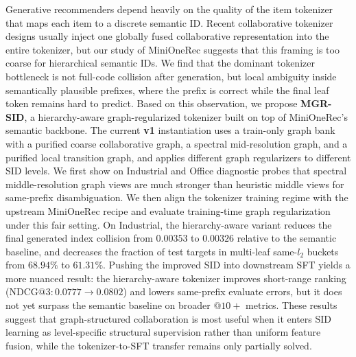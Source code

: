 Generative recommenders depend heavily on the quality of the item tokenizer that maps each item to a discrete semantic ID. Recent collaborative tokenizer designs usually inject one globally fused collaborative representation into the entire tokenizer, but our study of MiniOneRec suggests that this framing is too coarse for hierarchical semantic IDs. We find that the dominant tokenizer bottleneck is not full-code collision after generation, but local ambiguity inside semantically plausible prefixes, where the prefix is correct while the final leaf token remains hard to predict. Based on this observation, we propose \textbf{MGR-SID}, a hierarchy-aware graph-regularized tokenizer built on top of MiniOneRec's semantic \rqvae{} backbone. The current \textbf{v1} instantiation uses a train-only graph bank with a purified coarse collaborative graph, a spectral mid-resolution graph, and a purified local transition graph, and applies different graph regularizers to different SID levels. We first show on Industrial and Office diagnostic probes that spectral middle-resolution graph views are much stronger than heuristic middle views for same-prefix disambiguation. We then align the tokenizer training regime with the upstream MiniOneRec recipe and evaluate training-time graph regularization under this fair setting. On Industrial, the hierarchy-aware variant reduces the final generated index collision from $0.00353$ to $0.00326$ relative to the semantic baseline, and decreases the fraction of test targets in multi-leaf same-$l_2$ buckets from $68.94\%$ to $61.31\%$. Pushing the improved SID into downstream SFT yields a more nuanced result: the hierarchy-aware tokenizer improves short-range ranking ($\mathrm{NDCG}@3: 0.0777 \rightarrow 0.0802$) and lowers same-prefix evaluate errors, but it does not yet surpass the semantic baseline on broader $@10+$ metrics. These results suggest that graph-structured collaboration is most useful when it enters SID learning as level-specific structural supervision rather than uniform feature fusion, while the tokenizer-to-SFT transfer remains only partially solved.
